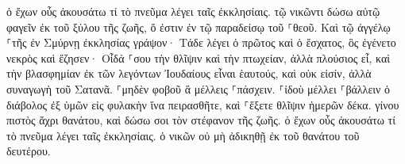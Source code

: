 \documentclass{openreader}
\begin{document}
ὁ ἔχων οὖς ἀκουσάτω τί τὸ πνεῦμα λέγει ταῖς ἐκκλησίαις. τῷ νικῶντι δώσω αὐτῷ φαγεῖν ἐκ τοῦ ξύλου τῆς ζωῆς, ὅ ἐστιν ἐν τῷ παραδείσῳ τοῦ ⸀θεοῦ. 
Καὶ τῷ ἀγγέλῳ ⸀τῆς ἐν Σμύρνῃ ἐκκλησίας γράψον· Τάδε λέγει ὁ πρῶτος καὶ ὁ ἔσχατος, ὃς ἐγένετο νεκρὸς καὶ ἔζησεν· 
Οἶδά ⸀σου τὴν θλῖψιν καὶ τὴν πτωχείαν, ἀλλὰ πλούσιος εἶ, καὶ τὴν βλασφημίαν ἐκ τῶν λεγόντων Ἰουδαίους εἶναι ἑαυτούς, καὶ οὐκ εἰσίν, ἀλλὰ συναγωγὴ τοῦ Σατανᾶ. 
⸀μηδὲν φοβοῦ ἃ μέλλεις ⸀πάσχειν. ⸀ἰδοὺ μέλλει ⸀βάλλειν ὁ διάβολος ἐξ ὑμῶν εἰς φυλακὴν ἵνα πειρασθῆτε, καὶ ⸀ἕξετε θλῖψιν ἡμερῶν δέκα. γίνου πιστὸς ἄχρι θανάτου, καὶ δώσω σοι τὸν στέφανον τῆς ζωῆς. 
ὁ ἔχων οὖς ἀκουσάτω τί τὸ πνεῦμα λέγει ταῖς ἐκκλησίαις. ὁ νικῶν οὐ μὴ ἀδικηθῇ ἐκ τοῦ θανάτου τοῦ δευτέρου. 
\end{document}
